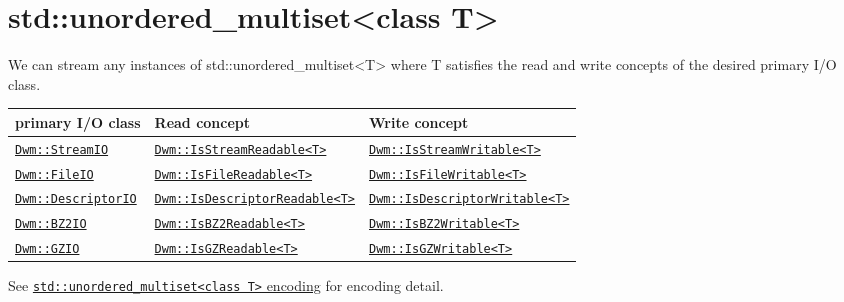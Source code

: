 \begin{minipage}{\textwidth}
\section{\ttfamily std::unordered\_multiset<class T>}
We can stream any instances of {\ttfamily std::unordered\_multiset<T>} where
{\ttfamily T} satisfies the read and write concepts of the desired
primary I/O class.
\vspace{1ex}

\begin{tabular}{lll}
  \textbf{primary I/O class} & \textbf{Read concept} & \textbf{Write concept} \\ \hline
  \hyperref[section:DwmStreamIOClass]{\texttt{Dwm::StreamIO}} & \hyperref[concept:DwmIsStreamReadable]{\texttt{Dwm::IsStreamReadable<T>}} & \hyperref[concept:DwmIsStreamWritable]{\texttt{Dwm::IsStreamWritable<T>}} \\
  \hyperref[section:DwmFileIOClass]{\texttt{Dwm::FileIO}} & \hyperref[concept:DwmIsFileReadable]{\texttt{Dwm::IsFileReadable<T>}} & \hyperref[concept:DwmIsFileWritable]{\texttt{Dwm::IsFileWritable<T>}} \\
  \hyperref[section:DwmDescriptorIOClass]{\texttt{Dwm::DescriptorIO}} & \hyperref[concept:DwmIsDescriptorReadable]{\texttt{Dwm::IsDescriptorReadable<T>}} & \hyperref[concept:DwmIsDescriptorWritable]{\texttt{Dwm::IsDescriptorWritable<T>}} \\
  \hyperref[section:DwmBZ2IOClass]{\texttt{Dwm::BZ2IO}} & \hyperref[concept:DwmIsBZ2Readable]{\texttt{Dwm::IsBZ2Readable<T>}} & \hyperref[concept:DwmIsBZ2Writable]{\texttt{Dwm::IsBZ2Writable<T>}} \\
  \hyperref[section:DwmGZIOClass]{\texttt{Dwm::GZIO}} & \hyperref[concept:DwmIsGZReadable]{\texttt{Dwm::IsGZReadable<T>}} & \hyperref[concept:DwmIsGZWritable]{\texttt{Dwm::IsGZWritable<T>}} \\
\end{tabular}
\vspace{1ex}

See \hyperref[encoding:stdUnorderedMultiset]{\texttt{std::unordered\_multiset<class T>} encoding} for encoding detail.
\end{minipage}

